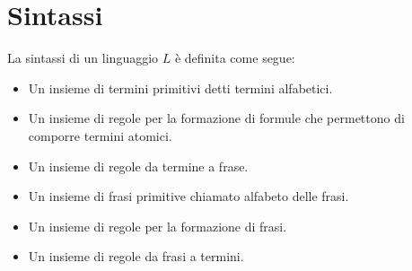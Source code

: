 \documentclass[../main.tex]{subfiles}
\begin{document}
   \section{Sintassi}
   La sintassi di un linguaggio $L$ è definita come segue:
   \begin{itemize}
      \item Un insieme di termini primitivi detti termini alfabetici.
      \item Un insieme di regole per la formazione di formule che permettono di comporre termini atomici.
      \item Un insieme di regole da termine a frase.
      \item Un insieme di frasi primitive chiamato alfabeto delle frasi.
      \item Un insieme di regole per la formazione di frasi.
      \item Un insieme di regole da frasi a termini.
   \end{itemize}
\end{document}
